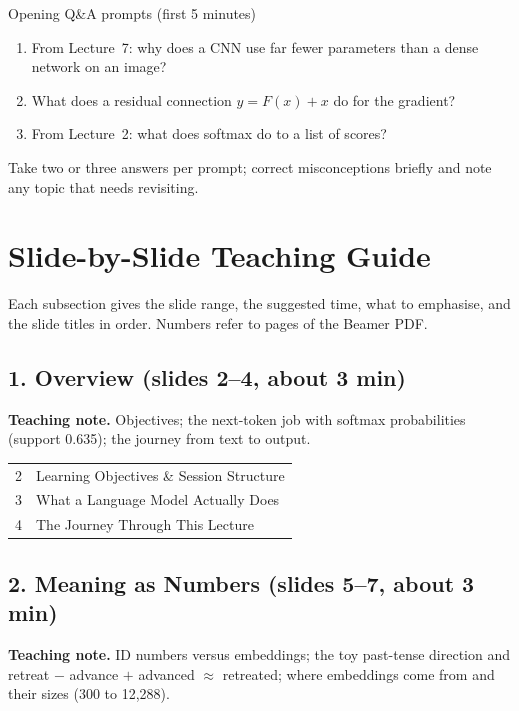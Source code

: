 \documentclass[11pt]{article}
\begin{document}
\begin{instr}{Opening Q\&A prompts (first 5 minutes)}\begin{enumerate}\item From Lecture~7: why does a CNN use far fewer parameters than a dense network on an image?\item What does a residual connection $y=F(x)+x$ do for the gradient?\item From Lecture~2: what does softmax do to a list of scores?\end{enumerate}Take two or three answers per prompt; correct misconceptions briefly and note any topic that needs revisiting.\end{instr}

\section{Slide-by-Slide Teaching Guide}

Each subsection gives the slide range, the suggested time, what to emphasise, and the slide titles in order. Numbers refer to pages of the Beamer PDF.

\subsection{1. Overview \normalfont\small\color{GreyN}(slides 2--4, about 3 min)}

\textbf{Teaching note.} Objectives; the next-token job with softmax probabilities (support 0.635); the journey from text to output.

\begin{center}\small\renewcommand{\arraystretch}{1.1}\begin{tabularx}{\textwidth}{@{}r X@{}}2 & Learning Objectives \& Session Structure\\
3 & What a Language Model Actually Does\\
4 & The Journey Through This Lecture\\\end{tabularx}\end{center}

\subsection{2. Meaning as Numbers \normalfont\small\color{GreyN}(slides 5--7, about 3 min)}

\textbf{Teaching note.} ID numbers versus embeddings; the toy past-tense direction and retreat $-$ advance $+$ advanced $\approx$ retreated; where embeddings come from and their sizes (300 to 12,288).
\end{document}
